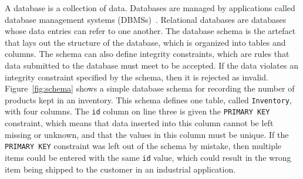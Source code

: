 

A database is a collection of data. Databases are managed by applications called database management systems
(DBMSs)~\cite{databasebook}.  Relational databases are databases whose data entries can refer to one another. The
database schema is the artefact that lays out the structure of the database, which is organized into tables and columns.
The schema can also define integrity constraints, which are rules that data submitted to the database must meet to be
accepted. If the data violates an integrity constraint specified by the schema, then it is rejected as invalid.
Figure~\ref{fig:schema} shows a simple database schema for recording the number of products kept in an inventory. This
schema defines one table, called \texttt{Inventory}, with four columns.  The \texttt{id} column on line three is given
the \texttt{PRIMARY KEY} constraint, which means that data inserted into this column cannot be left missing or unknown,
and that the values in this column must be unique. If the \texttt{PRIMARY KEY} constraint was left out of the schema by
mistake, then multiple items could be entered with the same \texttt{id} value, which could result in the wrong item
being shipped to the customer in an industrial application.
